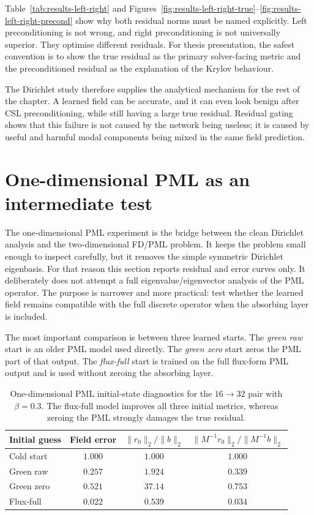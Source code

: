 Table~\ref{tab:results-left-right} and
Figures~\ref{fig:results-left-right-true}--\ref{fig:results-left-right-precond}
show why both residual norms must be named explicitly. Left preconditioning is
not wrong, and right preconditioning is not universally superior. They optimise
different residuals. For thesis presentation, the safest convention is to show
the true residual as the primary solver-facing metric and the preconditioned
residual as the explanation of the Krylov behaviour.

The Dirichlet study therefore supplies the analytical mechanism for the rest
of the chapter. A learned field can be accurate, and it can even look benign
after CSL preconditioning, while still having a large true residual. Residual
gating shows that this failure is not caused by the network being useless; it
is caused by useful and harmful modal components being mixed in the same field
prediction.

\section{One-dimensional PML as an intermediate test}
\label{sec:results-1d-pml}

The one-dimensional PML experiment is the bridge between the clean Dirichlet
analysis and the two-dimensional FD/PML problem. It keeps the problem small
enough to inspect carefully, but it removes the simple symmetric Dirichlet
eigenbasis. For that reason this section reports residual and error curves
only. It deliberately does not attempt a full eigenvalue/eigenvector analysis
of the PML operator. The purpose is narrower and more practical: test whether
the learned field remains compatible with the full discrete operator when the
absorbing layer is included.

The most important comparison is between three learned starts. The
\emph{green raw} start is an older PML model used directly. The
\emph{green zero} start zeros the PML part of that output. The
\emph{flux-full} start is trained on the full flux-form PML output and is used
without zeroing the absorbing layer.

\begin{table}[htbp]
\centering
\caption{One-dimensional PML initial-state diagnostics for the $16\to32$ pair
with $\beta=0.3$. The flux-full model improves all three initial metrics,
whereas zeroing the PML strongly damages the true residual.}
\label{tab:results-1d-pml-initial-state}
\begin{tabular}{lccc}
\toprule
Initial guess & Field error & $\|r_0\|_2/\|b\|_2$
& $\|M^{-1}r_0\|_2/\|M^{-1}b\|_2$ \\
\midrule
Cold start & $1.000$ & $1.000$ & $1.000$ \\
Green raw & $0.257$ & $1.924$ & $0.339$ \\
Green zero & $0.521$ & $37.14$ & $0.753$ \\
Flux-full & $0.022$ & $0.539$ & $0.034$ \\
\bottomrule
\end{tabular}
\end{table}

